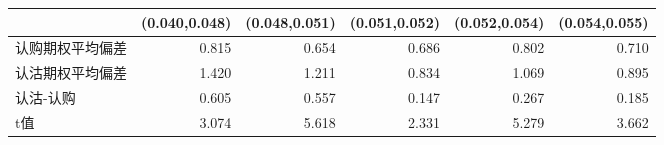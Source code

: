 \begin{tabularx}{\linewidth}{lrrrrr}
\toprule
{} &  (0.040,0.048) &  (0.048,0.051) &  (0.051,0.052) &  (0.052,0.054) &  (0.054,0.055) \\
\midrule
认购期权平均偏差 &  0.815 &  0.654 &  0.686 &  0.802 &  0.710 \\
认沽期权平均偏差 &  1.420 &  1.211 &  0.834 &  1.069 &  0.895 \\
认沽-认购    &  0.605 &  0.557 &  0.147 &  0.267 &  0.185 \\
t值       &  3.074 &  5.618 &  2.331 &  5.279 &  3.662 \\
\bottomrule
\end{tabularx}
